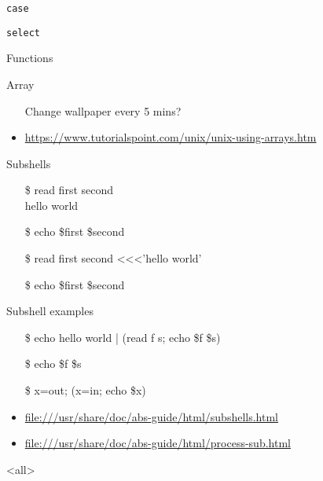 \begin{frame}{\texttt{case}}
  \begin{center}
  \end{center}
\end{frame}

\begin{frame}{\texttt{select}}
  \begin{center}
  \end{center}
\end{frame}

\begin{frame}{Functions}
\end{frame}

\begin{frame}{Array}
  \begin{center}
  \end{center}
  \begin{itemize}
  \item[\hw] Change wallpaper every 5 mins?
  \end{itemize}
\end{frame}

\begin{itemize}
\item \url{https://www.tutorialspoint.com/unix/unix-using-arrays.htm}
\end{itemize}

\begin{frame}{Subshells}\ttfamily
  \begin{itemize}
  \item[\$] read first second\\
    \quad hello world
  \item[\$] echo \$first \$second
  \item[] 
  \item[\$] read first second <<<'hello world'
  \item[\$] echo \$first \$second
  \end{itemize}
  \begin{iblock}{Subshell examples}
    \begin{itemize}
    \item[\$] echo hello world | (read f s; echo \$f \$s)
    \item[\$] echo \$f \$s
    \item[] 
    \item[\$] x=out; (x=in; echo \$x)
    \end{itemize}
  \end{iblock}
\end{frame}

\begin{itemize}
\item \url{file:///usr/share/doc/abs-guide/html/subshells.html}
\item \url{file:///usr/share/doc/abs-guide/html/process-sub.html}
\end{itemize}



\mode<all>
